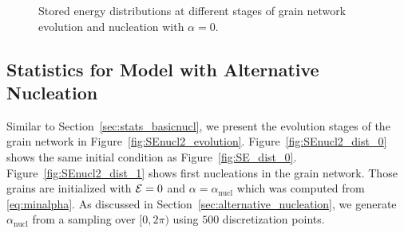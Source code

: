 \begin{figure}[ht]
{    \label{fig:SE_se_2}
    }%
\caption{Stored energy distributions at different stages of grain network evolution and nucleation with $\alpha = 0$.}
    \label{fig:SE_se}
\end{figure}


\subsection{Statistics for Model with Alternative Nucleation}

Similar to Section~\ref{sec:stats_basicnucl}, we present the evolution stages of the grain network in Figure~\ref{fig:SEnucl2_evolution}. Figure~\ref{fig:SEnucl2_dist_0} shows the same initial condition as Figure~\ref{fig:SE_dist_0}. Figure~\ref{fig:SEnucl2_dist_1} shows first nucleations in the grain network. 
Those grains are initialized with $\mathcal{E} = 0$ and $\alpha = \alpha_{\text{nucl}}$ which was computed from \eqref{eq:minalpha}. As discussed in Section~\ref{sec:alternative_nucleation}, we generate $\alpha_{\text{nucl}}$ from a sampling over $[0,2\pi)$ using $500$ discretization points.

